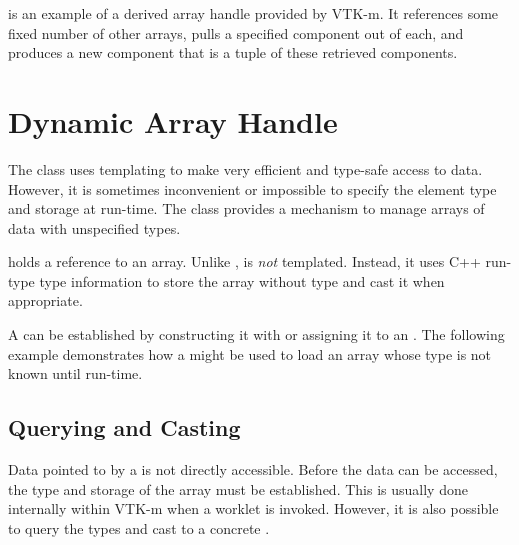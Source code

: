 is an example of a derived array
handle provided by VTK-m. It references some fixed number of other arrays,
pulls a specified component out of each, and produces a new component that
is a tuple of these retrieved components.




\section{Dynamic Array Handle}
\label{sec:DynamicArrayHandle}


The  class uses templating to make very
efficient and type-safe access to data. However, it is sometimes
inconvenient or impossible to specify the element type and storage at
run-time. The  class provides a mechanism
to manage arrays of data with unspecified types.

 holds a reference to an array. Unlike
,  is
\emph{not} templated. Instead, it uses C++ run-type type information to
store the array without type and cast it when appropriate.

A  can be established by constructing it
with or assigning it to an . The following
example demonstrates how a  might be
used to load an array whose type is not known until run-time.


\subsection{Querying and Casting}
\label{sec:DynamicArrayHandleQueryingAndCasting}

Data pointed to by a  is not directly
accessible. Before the data can be accessed, the type and storage of the
array must be established. This is usually done internally within VTK-m
when a worklet  is invoked. However, it is also possible to
query the types and cast to a concrete .

